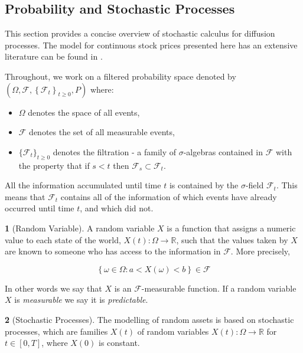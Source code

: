\documentclass[british]{amsart} \usepackage{lmodern}
\numberwithin{equation}{section} \numberwithin{figure}{section}
\theoremstyle{plain} \newtheorem{thm}{\protect\theoremname}[section]
\theoremstyle{definition} \newtheorem{defn}[thm]{\protect\definitionname}
\theoremstyle{plain} \newtheorem{assumption}[thm]{\protect\assumptionname}
\theoremstyle{plain} \newtheorem{lem}[thm]{\protect\lemmaname}
\theoremstyle{plain} \newtheorem{prop}[thm]{\protect\propositionname}
\theoremstyle{remark} \newtheorem{rem}[thm]{\protect\remarkname}
\theoremstyle{plain} \newtheorem{cor}[thm]{\protect\corollaryname}
\begin{document}
\subsection{Probability and Stochastic Processes}

This section provides a concise overview of stochastic calculus for
diffusion processes. The model for continuous stock prices presented
here has an extensive literature can be found in \cite{shreve1991}.

Throughout, we work on a filtered probability space denoted
by $(\Omega,\mathcal{F},\left\{ \mathcal{F}_{t}\right\} _{t\ge0},P)$
where:

\begin{itemize}
  \item $\Omega$ denotes the space of all events,
  \item $\mathcal{F}$ denotes the set of all measurable events,
  \item $\{ \mathcal{F}_{t}\}_{t\ge0}$ denotes the filtration
        - a family of $\sigma$-algebras contained in $\mathcal{F}$ with
        the property that if $s<t$ then $\mathcal{F}_{s}\subset\mathcal{F}_{t}$. 
\end{itemize}

All the information accumulated until time $t$ is contained by the
$\sigma$-field $\mathcal{F}_{t}$. This means that $\mathcal{F}_{t}$ contains 
all of the information of which events have already occurred until time $t$, 
and which did not. 

\begin{defn} [Random Variable]
 A random variable $X$ is a function that assigns a numeric value to each state of 
 the world, $X(t):\Omega\to\mathbb{R}$, such that the values taken by
 $X$ are known to someone who has access to the information in $\mathcal{F}$. 
  More precisely,

  \begin{equation}
    \left\{
      \omega \in \Omega : a < X(\omega) < b
    \right\} \in \mathcal{F}
  \end{equation}

  In other words we say that $X$ is an $\mathcal{F}$-measurable function. 
  If a random variable $X$ is \textit{measurable} we say it is \textit{predictable}.

\end{defn}

\begin{defn} [Stochastic Processes]
  The modelling of random assets is based on stochastic processes, which are
  families $X(t)$  of random variables $X(t):\Omega\to\mathbb{R}$ for $t\in[0,T]$,
  where $X(0)$ is constant.
\end{defn}
\end{document}
